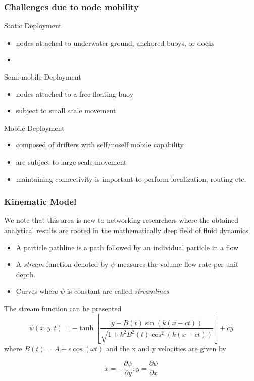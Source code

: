 \documentclass{beamer}
\begin{document}
\begin{frame}
\frametitle{Challenges due to node mobility}
\begin{block}{Static Deployment}
\begin{itemize}
\item nodes attached to underwater ground, anchored buoys, or docks
\item 
\end{itemize}
\end{block}
\begin{block}{Semi-mobile Deployment}
\begin{itemize}
\item nodes attached to a free floating buoy
\item subject to small scale movement 
\end{itemize}
\end{block}
\begin{block}{Mobile Deployment}
\begin{itemize}
\item composed of drifters with self/noself mobile capability
\item are subject to large scale movement
\item maintaining connectivity is important to perform localization, routing etc. 
\end{itemize}
\end{block}
\end{frame}
\begin{frame}
\frametitle{Kinematic Model}
We note that this area is new to networking researchers where the obtained analytical
results are rooted in the mathematically deep field of fluid dynamics.
\begin{itemize}
\item A particle pathline is a path followed by an individual particle in a flow
\item A \textit{stream} function denoted  by $\psi$ measures the volume flow rate per unit depth.
\item Curves where $\psi$ is constant are called \textit{streamlines}
\end{itemize}
The stream function can be presented \\
\begin{equation}\label{eq:sf}
\psi(x,y,t)=-\tanh{[\frac{y-B(t)\sin(k(x-ct))}{\sqrt{1 + k^2 B^2(t) \cos^2(k(x-ct))}} ]} + cy
\end{equation}
 where $  B(t) = A + \epsilon \cos(\omega t)$  and the x and y velocities are given by
 
 \begin{equation}\label{eq:lf}
\dot{x}=-\frac{\partial \psi}{\partial y} ; \dot{y}=\frac{\partial \psi}{\partial x}
\end{equation}
\end{frame}
\end{document}
